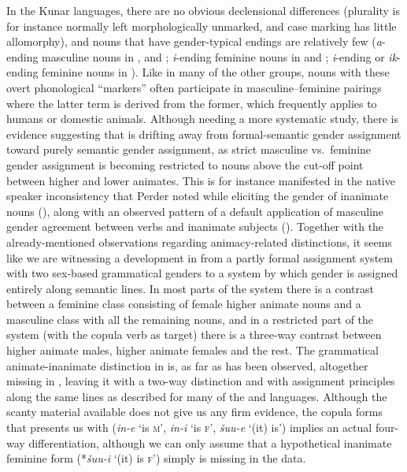 \documentclass[output=collectionpaper]{langsci/langscibook}
\begin{document}
\largerpage[-1]
In the Kunar languages, there are no obvious declensional differences (plurality is for instance normally left morphologically unmarked, and case marking has little allomorphy), and nouns that have gender-typical endings are relatively few (\textit{a}{}-ending masculine nouns in ,  and ; \textit{i}{}-ending feminine nouns in  and ; \textit{i}{}-ending or \textit{ik}{}-ending feminine nouns in ). Like in many of the other groups, nouns with these overt phonological ``markers'' often participate in masculine--feminine pairings where the latter term is derived from the former, which frequently applies to humans or domestic animals. Although needing a more systematic study, there is evidence suggesting that  is drifting away from formal-semantic gender assignment toward purely semantic gender assignment, as strict masculine vs.\ feminine gender assignment is becoming restricted to nouns above the cut-off point between higher and lower animates. This is for instance manifested in the native speaker inconsistency that Perder noted while eliciting the gender of inanimate nouns (\citeyear[54]{Perder2013}), along with an observed pattern of a default application of masculine gender agreement between verbs and inanimate subjects (\citeyear[111]{Perder2013}). Together with the already-mentioned observations regarding animacy-related distinctions, it seems like we are witnessing a development in  from a partly formal assignment system with two sex-based grammatical genders to a system by which gender is assigned entirely along semantic lines. In most parts of the system there is a contrast between a feminine class consisting of female higher animate nouns and a masculine class with all the remaining nouns, and in a restricted part of the system (with the copula verb as target) there is a three-way contrast between higher animate males, higher animate females and the rest. The grammatical animate-inanimate distinction in  is, as far as has been observed, altogether missing in , leaving it with a two-way distinction and with assignment principles along the same lines as described for many of the  and  languages. Although the scanty material available does not give us any firm evidence, the  copula forms that \citet[255]{Morgenstierne1945} presents us with (\textit{in-e} `is \textsc{m}', \textit{in-i} `is \textsc{f}', \textit{šuu-e} `(it) is') implies an actual four-way differentiation, although we can only assume that a hypothetical inanimate feminine form (*\textit{šuu-i} `(it) is \textsc{f}') simply is missing in the data.
\end{document}

